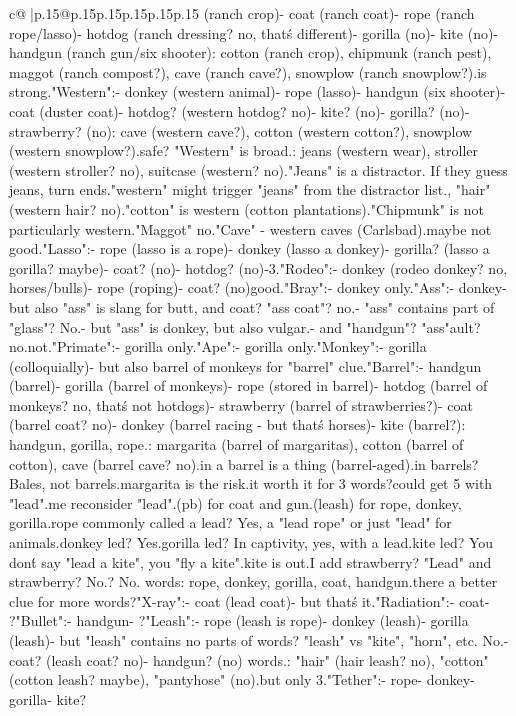 \documentclass{article}
\begin{document}
{\begin{supertabular}{c@{$\;$}|p{.15\linewidth}@{}p{.15\linewidth}p{.15\linewidth}p{.15\linewidth}p{.15\linewidth}p{.15\linewidth}}
{{{(ranch crop)\n- coat (ranch coat)\n- rope (ranch rope/lasso)\n- hotdog (ranch dressing? no, that\'s different)\n- gorilla (no)\n- kite (no)\n- handgun (ranch gun/six shooter)\nOpponent: cotton (ranch crop), chipmunk (ranch pest), maggot (ranch compost?), cave (ranch cave?), snowplow (ranch snowplow?).\nCotton is strong.\n\n"Western":\n- donkey (western animal)\n- rope (lasso)\n- handgun (six shooter)\n- coat (duster coat)\n- hotdog? (western hotdog? no)\n- kite? (no)\n- gorilla? (no)\n- strawberry? (no)\nOpponent: cave (western cave?), cotton (western cotton?), snowplow (western snowplow?).\nMaybe safe? "Western" is broad.\nDistractors: jeans (western wear), stroller (western stroller? no), suitcase (western? no).\n"Jeans" is a distractor. If they guess jeans, turn ends.\nSo "western" might trigger "jeans" from the distractor list.\nAlso, "hair" (western hair? no).\nBut "cotton" is western (cotton plantations).\n"Chipmunk" is not particularly western.\n"Maggot" no.\n"Cave" - western caves (Carlsbad).\nSo maybe not good.\n\n"Lasso":\n- rope (lasso is a rope)\n- donkey (lasso a donkey)\n- gorilla? (lasso a gorilla? maybe)\n- coat? (no)\n- hotdog? (no)-3.\n\n"Rodeo":\n- donkey (rodeo donkey? no, horses/bulls)\n- rope (roping)\n- coat? (no)\nNot good.\n\n"Bray":\n- donkey only.\n\n"Ass":\n- donkey\n- but also "ass" is slang for butt, and coat? "ass coat"? no.\n- "ass" contains part of "glass"? No.\n- but "ass" is donkey, but also vulgar.\n- and "handgun"? "ass"ault? no.\nBetter not.\n\n"Primate":\n- gorilla only.\n\n"Ape":\n- gorilla only.\n\n"Monkey":\n- gorilla (colloquially)\n- but also barrel of monkeys for "barrel" clue.\n\n"Barrel":\n- handgun (barrel)\n- gorilla (barrel of monkeys)\n- rope (stored in barrel)\n- hotdog (barrel of monkeys? no, that\'s not hotdogs)\n- strawberry (barrel of strawberries?)\n- coat (barrel coat? no)\n- donkey (barrel racing - but that\'s horses)\n- kite (barrel?): handgun, gorilla, rope.\nOpponents: margarita (barrel of margaritas), cotton (barrel of cotton), cave (barrel cave? no).\nMargarita in a barrel is a thing (barrel-aged).\nCotton in barrels? Bales, not barrels.\nSo margarita is the risk.\nIs it worth it for 3 words?\nI could get 5 with "lead".\n\nLet me reconsider "lead".\nLead (pb) for coat and gun.\nLead (leash) for rope, donkey, gorilla.\nIs rope commonly called a lead? Yes, a "lead rope" or just "lead" for animals.\nIs donkey led? Yes.\nIs gorilla led? In captivity, yes, with a lead.\nIs kite led? You don\'t say "lead a kite", you "fly a kite".\nSo kite is out.\nCan I add strawberry? "Lead" and strawberry? No.\nHotdog? No.\n{} words: rope, donkey, gorilla, coat, handgun.\n\nIs there a better clue for more words?\n\n"X-ray":\n- coat (lead coat)\n- but that\'s it.\n\n"Radiation":\n- coat\n- ?\n\n"Bullet":\n- handgun\n- ?\n\n"Leash":\n- rope (leash is rope)\n- donkey (leash)\n- gorilla (leash)\n- but "leash" contains no parts of words? "leash" vs "kite", "horn", etc. No.\n- coat? (leash coat? no)\n- handgun? (no) words.\nOpponent: "hair" (hair leash? no), "cotton" (cotton leash? maybe), "pantyhose" (no).\nSafe but only 3.\n\n"Tether":\n- rope\n- donkey\n- gorilla\n- kite? }}}
\end{supertabular}}
\end{document}
